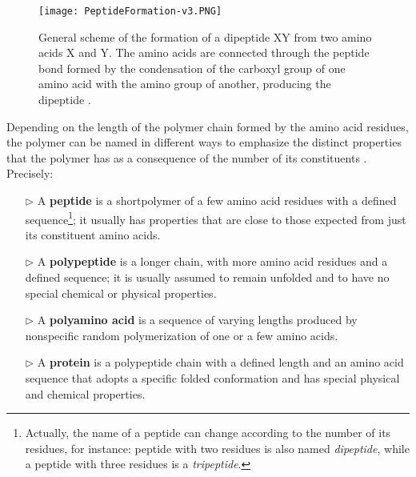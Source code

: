 
\begin{figure}[h]
\centering
\begin{minipage}[t]{\textwidth}
\centering
\texttt{[image: PeptideFormation-v3.PNG]}

\caption{\small{General scheme of the formation of a dipeptide XY from two amino acids X and Y. The amino acids are connected through the peptide bond formed by the condensation of the carboxyl group of one amino acid with the amino group of another, producing the dipeptide
\cite{creighton2010biophysical}.
}}

\label{fig:PeptideFormation}
\end{minipage} 
\end{figure}

Depending on the length of the polymer chain formed by the amino acid residues, the polymer can be named in different ways to emphasize the distinct properties that the polymer has as a consequence of the number of its constituents
\cite{creighton2010biophysical}.
Precisely:
\begin{itemize}
\item[$\triangleright$] A \textbf{peptide} is a shortpolymer of a few amino acid residues with a defined sequence\footnote{Actually, the name of a peptide can change according to the number of its residues, for instance: peptide with two residues is also named \textit{dipeptide}, while a peptide with three residues is a \textit{tripeptide}.}; it usually has properties that are close to those expected from just its constituent amino acids.
\item[$\triangleright$] A \textbf{polypeptide} is a longer chain, with more amino acid residues and a defined sequence; it is usually assumed to remain unfolded and to have no special chemical or physical properties. 
\item[$\triangleright$] A \textbf{polyamino acid} is a sequence of varying lengths produced by nonspecific random polymerization of one or a few amino acids.
\item[$\triangleright$] A \textbf{protein} is a polypeptide chain with a defined length and an amino acid sequence that adopts a specific folded conformation and has special physical and chemical properties.
\end{itemize}

